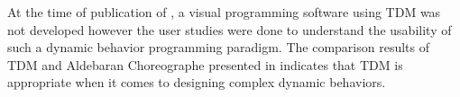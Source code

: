 %
At the time of publication of \cite{BerenzTDM2014}, a visual programming software using TDM was not developed however the user studies were done to understand the usability of such a dynamic behavior programming paradigm. The comparison results of TDM and Aldebaran Choreographe presented in \cite{BerenzTDM2014} indicates that TDM is appropriate when it comes to designing complex dynamic behaviors.
